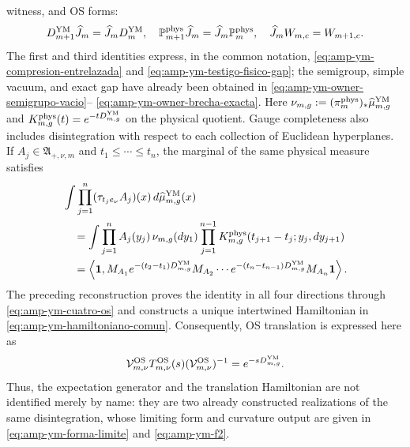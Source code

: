 witness, and OS forms:
\begin{equation}\label{eq:pdf2-g-gau-entrelazamiento-dato}
 D_{m+1}^{\rm YM}\widehat J_m=\widehat J_mD_m^{\rm YM},
 \quad
 \mathbb P_{m+1}^{\rm phys}\widehat J_m
  =\widehat J_m\mathbb P_m^{\rm phys},
 \quad
 \widehat J_mW_{m,c}=W_{m+1,c}.
\end{equation}
The first and third identities express, in the common
notation, \eqref{eq:amp-ym-compresion-entrelazada} and
\eqref{eq:amp-ym-testigo-fisico-gap}; the semigroup, simple vacuum, and
exact gap have already been obtained in
\eqref{eq:amp-ym-owner-semigrupo-vacio}--
\eqref{eq:amp-ym-owner-brecha-exacta}. Here
$\nu_{m,g}:=(\pi_m^{\rm phys})_*\widehat\mu_{m,g}^{\rm YM}$ and
$K_{m,g}^{\rm phys}(t)=e^{-tD_{m,g}^{\rm YM}}$ on the physical quotient.
Gauge completeness also includes disintegration with respect to each collection of
Euclidean hyperplanes. If $A_j\in\mathfrak A_{+,\nu,m}$ and
$t_1\le\cdots\le t_n$, the marginal of the same physical measure satisfies
\begin{equation}\label{eq:pdf2-g-gau-transfer-euclidean-dato}
\begin{aligned}
 &\int\prod_{j=1}^n
   (\tau_{t_je_\nu}A_j)(x)\,d\widehat\mu_{m,g}^{\rm YM}(x)\\
 &\quad=
 \int\prod_{j=1}^nA_j(y_j)\,
  \nu_{m,g}(dy_1)
  \prod_{j=1}^{n-1}K_{m,g}^{\rm phys}
       (t_{j+1}-t_j;y_j,dy_{j+1})\\
 &\quad=
 \left\langle\mathbf1,
  M_{A_1}e^{-(t_2-t_1)D_{m,g}^{\rm YM}}M_{A_2}\cdots
  e^{-(t_n-t_{n-1})D_{m,g}^{\rm YM}}M_{A_n}\mathbf1
 \right\rangle.
\end{aligned}
\end{equation}
The preceding reconstruction proves the identity in all four directions
through \eqref{eq:amp-ym-cuatro-os} and constructs a unique intertwined
Hamiltonian in \eqref{eq:amp-ym-hamiltoniano-comun}. Consequently, OS
translation is expressed here as
\begin{equation}\label{eq:pdf2-g-gau-os-generator-dato}
 \mathcal V_{m,\nu}^{\rm OS}T_{m,\nu}^{\rm OS}(s)
 (\mathcal V_{m,\nu}^{\rm OS})^{-1}
 =e^{-sD_{m,g}^{\rm YM}}.
\end{equation}
Thus, the expectation generator and the translation Hamiltonian are not
identified merely by name: they are two already constructed realizations of the same
disintegration, whose limiting form and curvature output are given in
\eqref{eq:amp-ym-forma-limite} and \eqref{eq:amp-ym-f2}.
